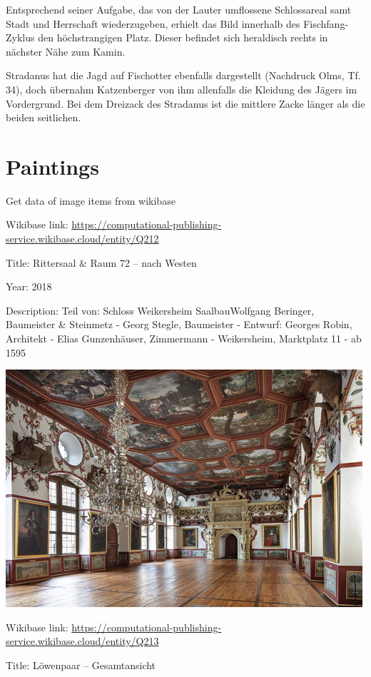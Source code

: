 \documentclass[
  letterpaper,
]{book}
\begin{document}
Entsprechend seiner Aufgabe, das von der Lauter umflossene Schlossareal
samt Stadt und Herrschaft wiederzugeben, erhielt das Bild innerhalb des
Fischfang-Zyklus den höchstrangigen Platz. Dieser befindet sich
heraldisch rechts in nächster Nähe zum Kamin.

Stradanus hat die Jagd auf Fischotter ebenfalls dargestellt (Nachdruck
Olms, Tf. 34), doch übernahm Katzenberger von ihm allenfalls die
Kleidung des Jägers im Vordergrund. Bei dem Dreizack des Stradanus ist
die mittlere Zacke länger als die beiden seitlichen.


\chapter{Paintings}\label{paintings}

Get data of image items from wikibase

Wikibase link:
\url{https://computational-publishing-service.wikibase.cloud/entity/Q212}

Title: Rittersaal \& Raum 72 -- nach Westen

Year: 2018

Description: Teil von: Schloss Weikersheim SaalbauWolfgang Beringer,
Baumeister \& Steinmetz - Georg Stegle, Baumeister - Entwurf: Georges
Robin, Architekt - Elias Gunzenhäuser, Zimmermann - Weikersheim,
Marktplatz 11 - ab 1595

\includegraphics{paintings_files/figure-pdf/cell-3-output-2.png}

Wikibase link:
\url{https://computational-publishing-service.wikibase.cloud/entity/Q213}

Title: Löwenpaar -- Gesamtansicht
\end{document}

